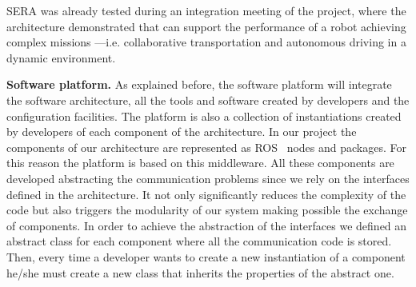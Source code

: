 SERA was already tested during an integration meeting of the project, where the architecture demonstrated that can support the performance of a robot achieving complex missions ---i.e. collaborative transportation and autonomous driving in a dynamic environment.


\textbf{Software platform.}
As explained before, the software platform will integrate the software architecture, all the tools and software created by developers and the configuration facilities.
The platform is also a collection of %
instantiations created by developers of each component of the architecture.
In our project the components of our architecture are represented as ROS~\cite{Quigley2009} nodes and packages.
For this reason the platform is based on this middleware.
All these components are developed abstracting the communication problems since we rely on the interfaces defined in the architecture.
It not only significantly reduces the complexity of the code but also triggers the modularity of our system making possible the exchange of components.
In order to achieve the abstraction of the interfaces we defined an abstract class for each component where all the communication code is stored.
Then, every time a developer wants to create a new instantiation of a component he/she must create a new class  that inherits the properties of the abstract one.


